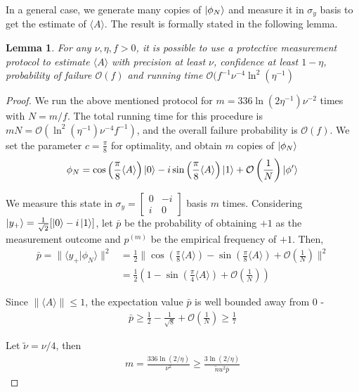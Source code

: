 \documentclass[]{article}
\newtheorem{lemma}{Lemma}
\newcommand{\cO}{\mathcal O}
\newcommand*{\E}[1]{\langle #1 \rangle}
\newcommand{\iprodq}[2]{\langle #1 \vert #2 \rangle}
\begin{document}
In a general case, we generate many copies of $\ket{\phi_N}$ and measure it in $\sigma_y$ basis to get the estimate of $\E{A}$. The result is formally stated in the following lemma.
\begin{lemma}
    For any $\nu, \eta, f > 0$, it is possible to use a protective measurement protocol to estimate $\E{A}$ with precision at least $\nu$, confidence at least $1- \eta$, probability of failure $\mathcal O(f)$ and running time $\mathcal O(f^{-1} \nu^{-4} \ln^2(\eta^{-1})$
\end{lemma}
\begin{proof}
    We run the above mentioned protocol for $m = 336 \ln (2 \eta^{-1}) \nu^{-2}$ times with $N = m/f$. The total running time for this procedure is $mN = \cO(\ln^2(\eta^{-1}) \nu^{-4} f^{-1})$, and the overall failure probability is $\cO(f)$. We set the parameter $c = \frac{\pi}{8}$ for optimality, and obtain $m$ copies of $\ket{\phi_N}$
    \begin{align}
        \phi_{N} = \cos \left(\frac{\pi}{8}\E{A}\right) \ket{0} - i \sin  \left(\frac{\pi}{8} \E{A}\right) \ket{1} + \cO \left(\frac{1}{N}\right) \ket{\phi'}
    \end{align}

    We measure this state in $\sigma_y = \begin{bmatrix}
        0 & -i \\ i & 0
    \end{bmatrix}$ basis $m$ times. Considering $\ket{y_+} = \frac{1}{\sqrt{2}}[\ket{0} - i \ket{1}]$, let $\bar p$ be the probability of obtaining $+1$ as the measurement outcome and $p^{(m)}$ be the empirical frequency of $+1$. Then,
    \begin{align*}\label{eq:bar_p}
        \bar p = \| \iprodq{y_+}{\phi_N} \|^2 &= \frac{1}{2} \| \cos \left(\frac{\pi}{8}\E{A}\right) -  \sin  \left(\frac{\pi}{8} \E{A}\right) + \cO \left(\frac{1}{N}\right) \|^2 \\
        &= \frac{1}{2} \left(1 - \sin \left(\frac{\pi}{4} \E{A}\right) + \cO \left(\frac{1}{N}\right)\right)
    \end{align*}

    Since $\|\E{A}\| \leq 1$, the expectation value $\bar p$ is well bounded away from $0$ - 
    \begin{align}
        \bar p \geq \frac{1}{2} - \frac{1}{\sqrt{8}} + \cO \left(\frac{1}{N}\right) \geq \frac{1}{7}
    \end{align}

    Let $\tilde \nu = \nu/4$, then
    \begin{align}
        m = \frac{336\ln(2/\eta)}{\nu^2} \geq \frac{3\ln(2/\eta)}{\tilde nu^2 \bar p}
    \end{align}
    

\end{proof}
\end{document}

